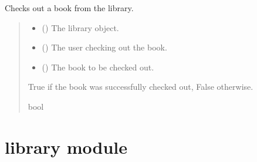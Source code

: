 \documentclass[letterpaper,10pt,english,openany,oneside]{sphinxmanual}
\begin{document}
\begin{fulllineitems}
\begin{fulllineitems}
\label{\detokenize{check:check.Check.check_out}}
\pysigstartsignatures
{}
\pysigstopsignatures
\sphinxAtStartPar
Checks out a book from the library.
\begin{quote}\begin{description}
\begin{itemize}
\item {} 
\sphinxAtStartPar
{} ({\hyperref[\detokenize{library:library.Library}]{}}) \textendash{} The library object.

\item {} 
\sphinxAtStartPar
{} ({\hyperref[\detokenize{user:user.User}]{}}) \textendash{} The user checking out the book.

\item {} 
\sphinxAtStartPar
{} ({\hyperref[\detokenize{book:book.Book}]{}}) \textendash{} The book to be checked out.

\end{itemize}

\sphinxAtStartPar
True if the book was successfully checked out, False otherwise.

\sphinxAtStartPar
bool

\end{description}\end{quote}

\end{fulllineitems}


\end{fulllineitems}


\sphinxstepscope


\section{library module}
\label{\detokenize{library:module-library}}\label{\detokenize{library:library-module}}\label{\detokenize{library::doc}}
\end{document}
